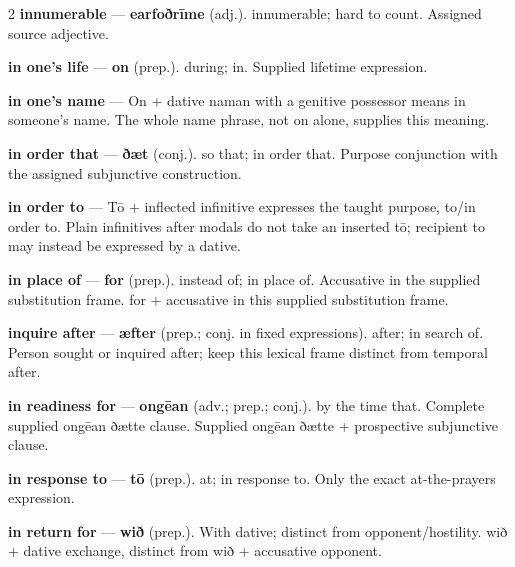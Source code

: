 \begin{multicols}{2}
\textbf{innumerable} — \textbf{earfoðrīme} (adj.). innumerable; hard to count. Assigned source adjective.\par
\textbf{in one's life} — \textbf{on} (prep.). during; in. Supplied lifetime expression.\par
\textbf{in one's name} — On + dative naman with a genitive possessor means in someone’s name. The whole name phrase, not on alone, supplies this meaning.\par
\textbf{in order that} — \textbf{ðæt} (conj.). so that; in order that. Purpose conjunction with the assigned subjunctive construction.\par
\textbf{in order to} — Tō + inflected infinitive expresses the taught purpose, to/in order to. Plain infinitives after modals do not take an inserted tō; recipient to may instead be expressed by a dative.\par
\textbf{in place of} — \textbf{for} (prep.). instead of; in place of. Accusative in the supplied substitution frame. for + accusative in this supplied substitution frame.\par
\textbf{inquire after} — \textbf{æfter} (prep.; conj. in fixed expressions). after; in search of. Person sought or inquired after; keep this lexical frame distinct from temporal after.\par
\textbf{in readiness for} — \textbf{ongēan} (adv.; prep.; conj.). by the time that. Complete supplied ongēan ðætte clause. Supplied ongēan ðætte + prospective subjunctive clause.\par
\textbf{in response to} — \textbf{tō} (prep.). at; in response to. Only the exact at-the-prayers expression.\par
\textbf{in return for} — \textbf{wið} (prep.). With dative; distinct from opponent/hostility. wið + dative exchange, distinct from wið + accusative opponent.\par

\end{multicols}
